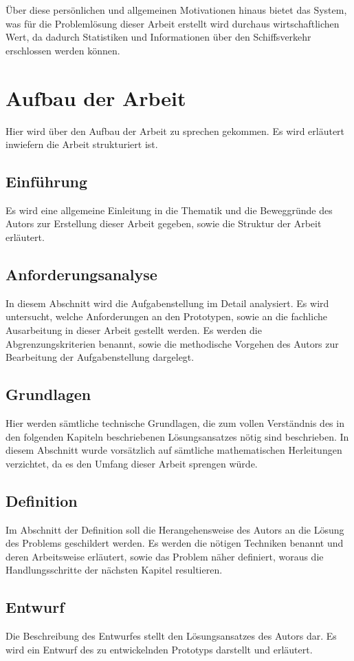 \"Uber diese persönlichen und allgemeinen Motivationen hinaus bietet das System, was für die Problemlösung dieser Arbeit erstellt wird durchaus wirtschaftlichen Wert, da dadurch Statistiken und Informationen über den Schiffsverkehr erschlossen werden können.

\section{Aufbau der Arbeit}
Hier wird über den Aufbau der Arbeit zu sprechen gekommen. Es wird erläutert inwiefern die Arbeit strukturiert ist.

\subsection{Einführung}
Es wird eine allgemeine Einleitung in die Thematik und die Beweggründe des Autors zur Erstellung dieser Arbeit gegeben, sowie die Struktur der Arbeit erläutert.
\subsection{Anforderungsanalyse}
In diesem Abschnitt wird die Aufgabenstellung im Detail analysiert. Es wird untersucht, welche Anforderungen an den Prototypen, sowie an die fachliche Ausarbeitung in dieser Arbeit gestellt werden. Es werden die Abgrenzungskriterien benannt, sowie die methodische Vorgehen des Autors zur Bearbeitung der Aufgabenstellung dargelegt.
\subsection{Grundlagen}
Hier werden sämtliche technische Grundlagen, die zum vollen Verständnis des in den folgenden Kapiteln beschriebenen Lösungsansatzes nötig sind beschrieben. In diesem Abschnitt wurde vorsätzlich auf sämtliche mathematischen Herleitungen verzichtet, da es den Umfang dieser Arbeit sprengen würde.
\subsection{Definition}
Im Abschnitt der Definition soll die Herangehensweise des Autors an die Lösung des Problems geschildert werden. Es werden die nötigen Techniken benannt und deren Arbeitsweise erläutert, sowie das Problem näher definiert, woraus die Handlungsschritte der nächsten Kapitel resultieren.
\subsection{Entwurf}
Die Beschreibung des Entwurfes stellt den Lösungsansatzes des Autors dar. Es wird ein Entwurf des zu entwickelnden Prototyps darstellt und erläutert.
